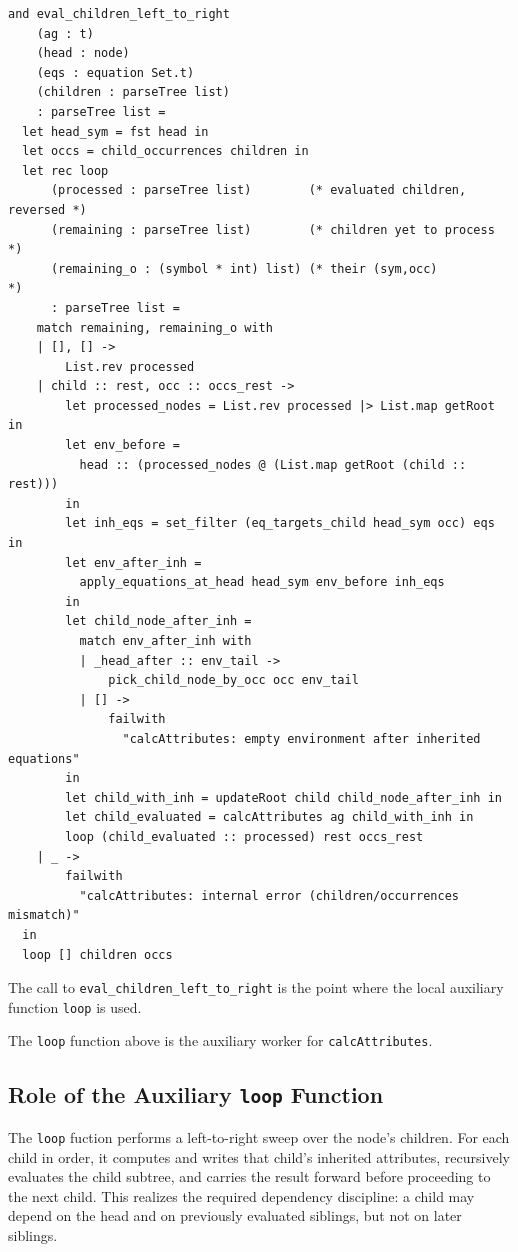 \begin{verbatim}
and eval_children_left_to_right
    (ag : t)
    (head : node)
    (eqs : equation Set.t)
    (children : parseTree list)
    : parseTree list =
  let head_sym = fst head in
  let occs = child_occurrences children in
  let rec loop
      (processed : parseTree list)        (* evaluated children, reversed *)
      (remaining : parseTree list)        (* children yet to process     *)
      (remaining_o : (symbol * int) list) (* their (sym,occ)             *)
      : parseTree list =
    match remaining, remaining_o with
    | [], [] ->
        List.rev processed
    | child :: rest, occ :: occs_rest ->
        let processed_nodes = List.rev processed |> List.map getRoot in
        let env_before =
          head :: (processed_nodes @ (List.map getRoot (child :: rest)))
        in
        let inh_eqs = set_filter (eq_targets_child head_sym occ) eqs in
        let env_after_inh =
          apply_equations_at_head head_sym env_before inh_eqs
        in
        let child_node_after_inh =
          match env_after_inh with
          | _head_after :: env_tail ->
              pick_child_node_by_occ occ env_tail
          | [] ->
              failwith
                "calcAttributes: empty environment after inherited equations"
        in
        let child_with_inh = updateRoot child child_node_after_inh in
        let child_evaluated = calcAttributes ag child_with_inh in
        loop (child_evaluated :: processed) rest occs_rest
    | _ ->
        failwith
          "calcAttributes: internal error (children/occurrences mismatch)"
  in
  loop [] children occs
\end{verbatim}

The call to \texttt{eval\_children\_left\_to\_right} is the point where the local auxiliary function \texttt{loop} is used. 

The \texttt{loop} function above is the auxiliary worker for \texttt{calcAttributes}. 

\subsection{Role of the Auxiliary \texttt{loop} Function}
The \texttt{loop} fuction performs a left-to-right sweep over the node's children. For each child in order, it computes and writes that child's inherited 
attributes, recursively evaluates the child subtree, and carries the result forward before proceeding to the next child. 
This realizes the required dependency discipline: a child may depend on the head and on previously evaluated siblings, but not on later siblings. 

